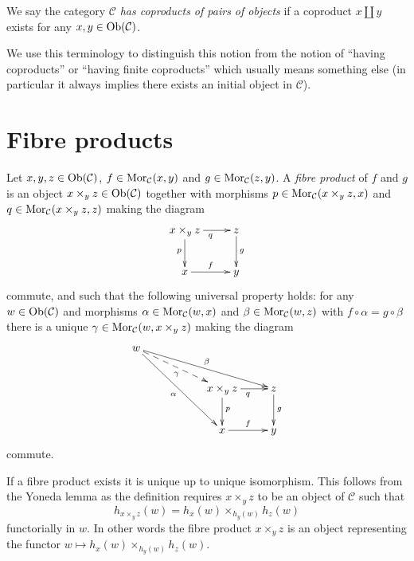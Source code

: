 \begin{definition}
\label{definition-has-coproducts-of-pairs}
We say the category $\mathcal{C}$ {\it has coproducts of pairs
of objects} if a coproduct $x \amalg y$
exists for any $x, y \in \mathop{\mathrm{Ob}}\nolimits(\mathcal{C})$.
\end{definition}

\noindent
We use this terminology to distinguish this notion from the notion
of ``having coproducts'' or ``having finite coproducts'' which usually means
something else (in particular it always implies there exists an
initial object in $\mathcal{C}$).





\section{Fibre products}
\label{section-fibre-products}

\begin{definition}
\label{definition-fibre-products}
Let $x, y, z\in \mathop{\mathrm{Ob}}\nolimits(\mathcal{C})$,
$f\in \mathop{\mathrm{Mor}}\nolimits_\mathcal{C}(x, y)$
and $g\in \mathop{\mathrm{Mor}}\nolimits_{\mathcal C}(z, y)$.
A {\it fibre product} of $f$ and $g$ is
an object $x \times_y z\in \mathop{\mathrm{Ob}}\nolimits(\mathcal{C})$
together with morphisms
$p \in \mathop{\mathrm{Mor}}\nolimits_{\mathcal C}(x \times_y z, x)$ and
$q \in \mathop{\mathrm{Mor}}\nolimits_{\mathcal C}(x \times_y z, z)$ making the diagram
$$
\xymatrix{
x \times_y z \ar[r]_q \ar[d]_p & z \ar[d]^g \\
x \ar[r]^f & y
}
$$
commute, and such that the following universal property holds: for
any $w\in \mathop{\mathrm{Ob}}\nolimits(\mathcal{C})$ and morphisms
$\alpha \in \mathop{\mathrm{Mor}}\nolimits_{\mathcal C}(w, x)$ and
$\beta \in \mathop{\mathrm{Mor}}\nolimits_\mathcal{C}(w, z)$ with
$f \circ \alpha = g \circ \beta$
there is a unique
$\gamma \in \mathop{\mathrm{Mor}}\nolimits_{\mathcal C}(w, x \times_y z)$ making
the diagram
$$
\xymatrix{
w \ar[rrrd]^\beta \ar@{-->}[rrd]_\gamma \ar[rrdd]_\alpha & & \\
& & x \times_y z \ar[d]^p \ar[r]_q & z \ar[d]^g \\
& & x \ar[r]^f & y
}
$$
commute.
\end{definition}

\noindent
If a fibre product exists it is unique up to unique
isomorphism. This follows from the Yoneda lemma as
the definition requires $x \times_y z$ to be an object
of $\mathcal{C}$ such that
$$
h_{x \times_y z}(w) = h_x(w) \times_{h_y(w)} h_z(w)
$$
functorially in $w$. In other words the fibre product $x \times_y z$
is an object representing the functor
$w \mapsto h_x(w) \times_{h_y(w)} h_z(w)$.

